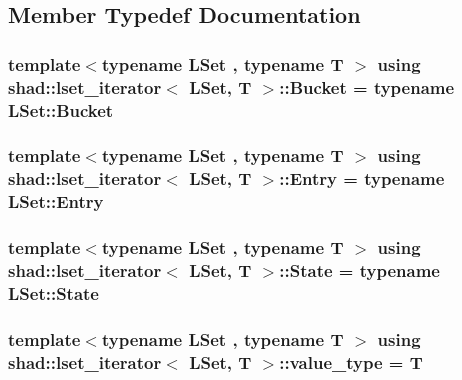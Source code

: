 \subsection{Member Typedef Documentation}
\hypertarget{classshad_1_1lset__iterator_a0b81feae1847d0043863c2da36bb87a6}{
\subsubsection[{Bucket}]{\setlength{\rightskip}{0pt plus 5cm}template$<$typename L\-Set , typename T $>$ using {\bf shad\-::lset\-\_\-iterator}$<$ L\-Set, T $>$\-::{\bf Bucket} =  typename L\-Set\-::\-Bucket}}\label{classshad_1_1lset__iterator_a0b81feae1847d0043863c2da36bb87a6}
\hypertarget{classshad_1_1lset__iterator_a62e8c31166259f0e57eb48f806f972d0}{
\subsubsection[{Entry}]{\setlength{\rightskip}{0pt plus 5cm}template$<$typename L\-Set , typename T $>$ using {\bf shad\-::lset\-\_\-iterator}$<$ L\-Set, T $>$\-::{\bf Entry} =  typename L\-Set\-::\-Entry}}\label{classshad_1_1lset__iterator_a62e8c31166259f0e57eb48f806f972d0}
\hypertarget{classshad_1_1lset__iterator_a15c9f616a8a9f87f058577ec6fb53165}{
\subsubsection[{State}]{\setlength{\rightskip}{0pt plus 5cm}template$<$typename L\-Set , typename T $>$ using {\bf shad\-::lset\-\_\-iterator}$<$ L\-Set, T $>$\-::{\bf State} =  typename L\-Set\-::\-State}}\label{classshad_1_1lset__iterator_a15c9f616a8a9f87f058577ec6fb53165}
\hypertarget{classshad_1_1lset__iterator_ac9b86123c9a840daa090846707502800}{
\subsubsection[{value\-\_\-type}]{\setlength{\rightskip}{0pt plus 5cm}template$<$typename L\-Set , typename T $>$ using {\bf shad\-::lset\-\_\-iterator}$<$ L\-Set, T $>$\-::{\bf value\-\_\-type} =  T}}\label{classshad_1_1lset__iterator_ac9b86123c9a840daa090846707502800}


